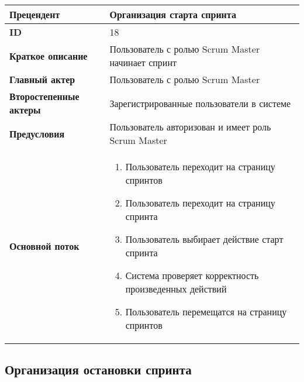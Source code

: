 \documentclass[14pt,a4paper]{extarticle}
\begin{document}
\begin{tabular}{|l|p{9cm}|}
	\hline
	\textbf{Прецендент}            & Организация старта спринта                                 \\
	\hline
	\textbf{ID}                    & 18                                                         \\
	\hline
	\textbf{Краткое описание}      & Пользователь с ролью Scrum Master начинает спринт          \\
	\hline
	\textbf{Главный актер}         & Пользователь с ролью Scrum Master                          \\
	\hline
	\textbf{Второстепенные актеры} & Зарегистрированные пользователи в системе                  \\
	\hline
	\textbf{Предусловия}           & Пользователь авторизован и имеет роль Scrum Master         \\
	\hline
	\textbf{Основной поток}        & \begin{enumerate}
		                                 \item Пользователь переходит на страницу спринтов
		                                 \item Пользователь переходит на страницу спринта
		                                 \item Пользователь выбирает действие старт спринта
		                                 \item Система проверяет корректность произведенных действий
		                                 \item Пользователь перемещатся на страницу спринтов
	                                 \end{enumerate} \\
	\hline
\end{tabular}

\subsection{Организация остановки спринта}
\end{document}
